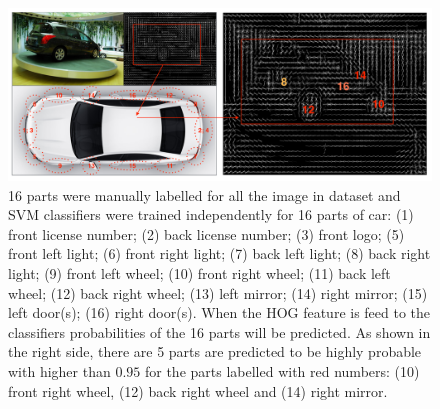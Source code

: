 \documentclass{tutmscthesis}[2010/09/22]
\numberwithin{equation}{section}
\numberwithin{table}{section}
\numberwithin{figure}{section}
\begin{document}
\begin{figure}[h]
\centering
\includegraphics[width=0.98\linewidth]{visible_parts.png}
\caption{16 parts were manually labelled for all the image in dataset and SVM classifiers were trained independently for 16 parts of car: (1) front license number; (2) back license number; (3) front logo; (5) front left light; (6) front right light; (7) back left light; (8) back right light; (9) front left wheel; (10) front right wheel; (11) back left wheel; (12) back right wheel; (13) left mirror; (14) right mirror; (15) left door(s); (16) right door(s). When the HOG feature is feed to the classifiers probabilities of the 16 parts will be predicted. As shown in the right side, there are 5 parts are predicted to be highly probable with higher than $0.95$ for the parts labelled with red numbers: (10) front right wheel, (12) back right wheel and (14) right mirror. }
\label{fig:parts} 
\end{figure}
\end{document}
